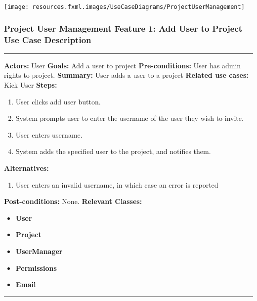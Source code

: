 \documentclass[twoside,letterpaper]{article}
\begin{document}
\texttt{[image: resources.fxml.images/UseCaseDiagrams/ProjectUserManagement]}

\newpage

\subsubsection[Project User Management Feature 1: Add User to Project Use Case Description]{\rmfamily\bfseries\color{black}
	Project User Management Feature 1: Add User to Project Use Case Description}
\hypertarget{RefHeading22059017292}{}

\vspace{2pt}
\hrule
\vspace{8pt}
 \textbf{Actors:} User \newline
\textbf{Goals:} Add a user to project \newline
 \textbf{Pre-conditions:} User has admin rights to project. \newline
 \textbf{Summary:} User adds a user to a project \newline
\textbf{Related use cases:} Kick User \newline
\textbf{Steps:} \begin{enumerate}
  \item User clicks add user button.
  \item System prompts user to enter the username of the user they wish to invite.
  \item User enters username.
  \item System adds the specified user to the project, and notifies them.
 \end{enumerate}
 \textbf{Alternatives:} \begin{enumerate}
  \item User enters an invalid username, in which case an error is reported
 \end{enumerate}
 \textbf{Post-conditions:} None. \newline
\vspace{8pt}
\textbf{Relevant Classes:}
\begin{itemize}
	\item \textbf{User}
	\item \textbf{Project}
	\item \textbf{UserManager}
	\item \textbf{Permissions}
	\item \textbf{Email}
\end{itemize}
\hrule
\newpage
\end{document}
